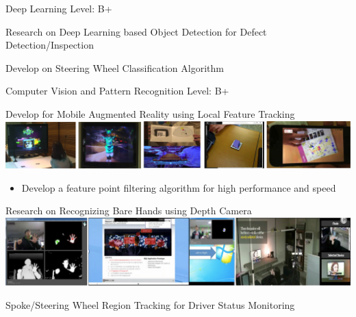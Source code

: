 


\begin{cventries}
  \cventry
    {Deep Learning} %
    {} %
    {} %
    {Level: B+} %
    {
      \begin{cvitems} %
        \item {Research on Deep Learning based Object Detection for Defect Detection/Inspection}
        \item {Develop on Steering Wheel Classification Algorithm}
      \end{cvitems}
    }

  \cventry
    {Computer Vision and Pattern Recognition} %
    {} %
    {} %
    {Level: B+} %
    {
      \begin{cvitems} %
        \item {Develop for Mobile Augmented Reality using Local Feature Tracking \\
               \includegraphics[width=\linewidth]{resources/ar.png} }
          \begin{itemize}
            \item {Develop a feature point filtering algorithm for high performance and speed}
          \end{itemize}
        \item {Research on Recognizing Bare Hands using Depth Camera \\
               \includegraphics[width=\linewidth]{resources/hand.png} }
        \item {Spoke/Steering Wheel Region Tracking for Driver Status Monitoring}
      \end{cvitems}
    }


\end{cventries}
